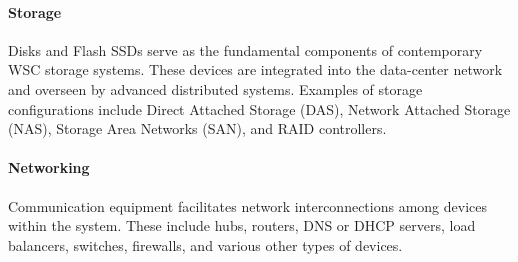 \paragraph*{Storage}
Disks and Flash SSDs serve as the fundamental components of contemporary WSC storage systems. 
These devices are integrated into the data-center network and overseen by advanced distributed systems. 
Examples of storage configurations include Direct Attached Storage (DAS), Network Attached Storage (NAS), Storage Area Networks (SAN), and RAID controllers.

\paragraph*{Networking}
Communication equipment facilitates network interconnections among devices within the system. 
These include hubs, routers, DNS or DHCP servers, load balancers, switches, firewalls, and various other types of devices.